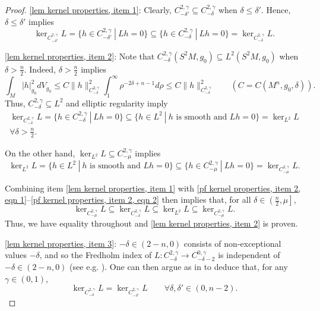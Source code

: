 \documentclass[12pt]{amsart}
\renewcommand{\1}{{\mathbf 1}}
\theoremstyle{others}
\numberwithin{equation}{section}
\begin{document}
\begin{proof}
    \eqref{lem kernel properties, item 1}:
    Clearly, $C^{2, \gamma}_{-\delta'} \subseteq C^{2, \gamma}_{-\delta}$ when $\delta \le \delta'$.
    Hence, $\delta \le \delta'$ implies
        $$\ker_{C^{2, \gamma}_{-\delta'} } L 
        = \{ h \in C^{2, \gamma}_{-\delta'} \ | \ L h = 0 \} \subseteq \{ h \in C^{2, \gamma}_{-\delta} \ | \ L h = 0 \} = \ker_{C^{2, \gamma}_{-\delta}} L.$$

    \eqref{lem kernel properties, item 2}:
    Note that $C^{2, \gamma}_{-\delta} (S^2 M, g_0) \subseteq L^2(S^2M, g_0) $ when $\delta > \frac n2$.
    Indeed, $\delta > \frac n2$ implies
        $$\int_M | h |_{g_0}^2 dV_{g_0} \le C \| h \|^2_{C^{2, \gamma}_{-\delta} } \int_1^\infty \rho^{-2 \delta + n-1} d \rho
        \le C \| h \|^2_{C^{2, \gamma}_{-\delta}}
        \qquad ( C = C(M^n, g_0, \delta) ).$$
    Thus, $C^{2, \gamma}_{-\delta} \subseteq L^2$ and elliptic regularity imply
    \begin{multline} \label{pf kernel properties, item 2, eqn 1}
        \ker_{C^{2, \gamma}_{-\delta} } L = \{ h \in C^{2, \gamma}_{-\delta} \ | \ L h = 0 \} \subseteq \{ h \in L^2 \ | \ h \text{ is smooth and } Lh = 0 \} = \ker_{L^2 } L  \\ \forall \delta > \frac n2.
    \end{multline}

        
    On the other hand, $\ker_{L^2} L \subseteq C^{2, \gamma}_{-\mu} $ implies
    \begin{equation} \label{pf kernel properties, item 2, eqn 2}
        \ker_{L^2} L = \{ h \in L^2 \ | \ h \text{ is smooth and } L h = 0 \} 
        \subseteq \{ h \in C^{2, \gamma}_{-\mu} \  | \ Lh = 0 \} = \ker_{C^{2, \gamma}_{-\mu}} L.  
    \end{equation}

    Combining item \eqref{lem kernel properties, item 1} with \eqref{pf kernel properties, item 2, eqn 1}--\eqref{pf kernel properties, item 2, eqn 2} then implies that, for all $\delta \in \left( \frac n2 ,\mu \right]$,
    $$\ker_{C^{2, \gamma}_{-\mu}} L \subseteq \ker_{C^{2, \gamma}_{-\delta}} L \subseteq \ker_{L^2 }L \subseteq \ker_{C^{2,\gamma}_{-\mu}} L .$$
    Thus, we have equality throughout and \eqref{lem kernel properties, item 2} is proven.
    
    

    \eqref{lem kernel properties, item 3}:
    $-\delta \in (2-n, 0)$ consists of non-exceptional values $-\delta$, 
    and so the Fredholm index of $L : C^{2, \gamma}_{-\delta} \to C^{0, \gamma}_{-\delta -2}$ is independent of $-\delta \in (2-n, 0)$ (see e.g. \cite[Corollary 4.22, Theorem 4.24, Corollary 4.27, and Chapter 5]{Marshall02}).
    One can then argue as in \cite[Lemma 7.1]{LM85} to deduce that, for any $\gamma \in (0,1)$, 
        $$\ker_{C^{2, \gamma}_{-\delta}} L = \ker_{C^{2, \gamma}_{-\delta'}} L \qquad \forall \delta, \delta' \in (0, n-2).$$
\end{proof}
\end{document}
